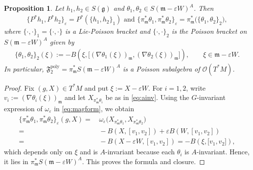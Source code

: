 \documentclass[11pt]{amsart}
\newtheorem{proposition}[theorem]{Proposition}
\theoremstyle{definition}
\theoremstyle{plain}
\theoremstyle{conclusion}
\begin{document}
 \begin{proposition}
 \label{prop:slicepoisson}
Let $h_1,h_2 \in S(\mathfrak{g})$ and $\theta_1,\theta_2\in S(\mathfrak{m}-\varepsilon W)^A$. Then %
\begin{align*}
\{P^*h_1,P^*h_2\}_\varepsilon = P^*\left(\{h_1,h_2\}_1\right) \text{ and } \{\pi_\mathfrak{m}^*\theta_1,\pi_\mathfrak{m}^*\theta_2\}_\varepsilon=\pi_\mathfrak{m}^*\bigl(\{\theta_1,\theta_2\}_2\bigr),
\end{align*} where $\{\cdot,\cdot\}_1 = \{\cdot,\cdot\} $ is a Lie-Poisson bracket and $\{\cdot,\cdot\}_2$ is the Poisson bracket on $S(\mathfrak{m}-\varepsilon W)^A$ given by \begin{align*}
\{\theta_1,\theta_2\}_2(\xi) :=-B \left(\xi,\bigl[(\nabla\theta_1(\xi))_{\mathfrak{m}},(\nabla\theta_2(\xi))_{\mathfrak{m}}\bigr]\right),
\qquad \xi\in \mathfrak{m}-\varepsilon W .
\end{align*}
In particular, $\mathfrak{F}_2^{\mathrm{poly}}=\pi_\mathfrak{m}^* S(\mathfrak{m}-\varepsilon W)^A$
is a Poisson subalgebra of $\mathcal{O}(T^* M)$.
\end{proposition}

\begin{proof}
Fix $(g,X)\in T^* M$ and put $\xi:=X-\varepsilon W$. For $i=1,2$, write $v_i:=(\nabla\theta_i(\xi))_{\mathfrak{m}}$ and let $X_{\pi_\mathfrak{m}^*\theta_i}$ be as in \eqref{eq:ainv}. Using the $G$-invariant expression of $\omega_\varepsilon$ in \eqref{eq:magform}, we obtain \begin{align*}
\{\pi_\mathfrak{m}^*\theta_1,\pi_\mathfrak{m}^*\theta_2\}_\varepsilon(g,X) = & \, \omega_\varepsilon \bigl(X_{\pi_\mathfrak{m}^*\theta_1},X_{\pi_\mathfrak{m}^*\theta_2}\bigr) \\
= & \,-B(X,[v_1,v_2])+\varepsilon B(W,[v_1,v_2]) \\
= &\,-B(X-\varepsilon W,[v_1,v_2]) =-B \left(\xi,\bigl[v_1,v_2\bigr]\right),
\end{align*}  which depends only on $\xi$ and is $A$-invariant because each $\theta_i$ is $A$-invariant. Hence, it lies in $\pi_\mathfrak{m}^* S(\mathfrak{m}-\varepsilon W)^A$. This proves the formula and closure.
\end{proof}


\end{document}

